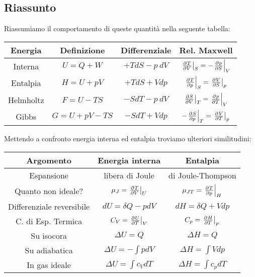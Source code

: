 \subsection{Riassunto}
Riassumiamo il comportamento di queste quantit\`a nella seguente tabella:
\begin{center}
\begin{tabular}{|c||c|c|c|}
\hline
Energia & Definizione &Differenziale & Rel. Maxwell\\\hline
Interna & $U=Q+W$ & $+TdS-p\ dV$ & $\ppb VTS=-\ppb SpV$\\
Entalpia & $H=U+pV$ & $+TdS+Vdp$ & $\ppb pTS=\ppb SVp$\\
Helmholtz & $F=U-TS$ & $-SdT-p\ dV$ & $\ppb VST=\ppb TpV$\\
Gibbs & $G=U+pV-TS$ & $-SdT+Vdp$ & $-\ppb pST=\ppb TVp$\\\hline
\end{tabular}
\end{center}
Mettendo a confronto energia interna ed entalpia troviamo ulteriori similitudini:
\begingroup
\renewcommand{\arraystretch}{1.5}
\begin{center}
\begin{tabular}{|c||c||c|}
\hline
Argomento & Energia interna & Entalpia\\\hline\hline
Espansione & libera di Joule & di Joule-Thompson\\\hline
Quanto non ideale?& $\mu_J=\ppb VTU$ & $\mu_{JT}=\ppb pTH$\\\hline
Differenziale reversibile &$dU=\delta Q-pdV$ & $dH =\delta Q+Vdp$\\\hline
C. di Esp. Termica&$C_V=\ppb TUV$ & $C_p=\ppb THp$\\\hline
Su isocora & $\Delta U=Q$ & $\Delta H=Q$\\\hline
Su adiabatica & $\Delta U=-\int pdV$ &  $\Delta H=\int Vdp$\\\hline
In gas ideale & $\Delta U=\int c_VdT$ & $\Delta H=\int c_pdT$\\\hline
\end{tabular}
\end{center}
\endgroup

